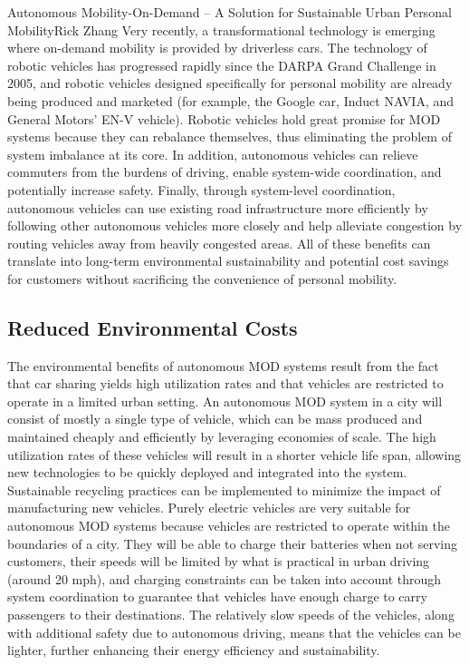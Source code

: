 \documentclass{papertex}
\begin{document}
\begin{news}{2}{Autonomous Mobility-On-Demand – A Solution for Sustainable Urban Personal Mobility}{Rick Zhang}{}{}
Very recently, a transformational technology is emerging where on-demand 
mobility is provided by driverless cars. The technology of robotic vehicles 
has progressed rapidly since the DARPA Grand Challenge in 2005, and robotic 
vehicles designed specifically for personal mobility are already being produced 
and marketed (for example, the Google car, Induct NAVIA, and General Motors’ 
EN-V vehicle). Robotic vehicles hold great promise for MOD systems because 
they can rebalance themselves, thus eliminating the problem of system imbalance 
at its core. In addition, autonomous vehicles can relieve commuters from the 
burdens of driving, enable system-wide coordination, and potentially increase 
safety. Finally, through system-level coordination, autonomous vehicles can 
use existing road infrastructure more efficiently by following other 
autonomous vehicles more closely and help alleviate congestion by routing 
vehicles away from heavily congested areas. All of these benefits can 
translate into long-term environmental sustainability and potential cost 
savings for customers without sacrificing the convenience of personal 
mobility.

\subsection*{\textbf{Reduced Environmental Costs}}

The environmental benefits of autonomous MOD systems result from the fact that 
car sharing yields high utilization rates and that vehicles are restricted to 
operate in a limited urban setting. An autonomous MOD system in a city will 
consist of mostly a single type of vehicle, which can be mass produced and 
maintained cheaply and efficiently by leveraging economies of scale. The high 
utilization rates of these vehicles will result in a shorter vehicle life 
span, allowing new technologies to be quickly deployed and integrated into 
the system. Sustainable recycling practices can be implemented to minimize 
the impact of manufacturing new vehicles. Purely electric vehicles are very 
suitable for autonomous MOD systems because vehicles are restricted to 
operate within the boundaries of a city. They will be able to charge their 
batteries when not serving customers, their speeds will be limited by what is 
practical in urban driving (around 20 mph), and charging constraints can be 
taken into account through system coordination to guarantee that vehicles have 
enough charge to carry passengers to their destinations. The relatively slow 
speeds of the vehicles, along with additional safety due to autonomous driving, 
means that the vehicles can be lighter, further enhancing their energy 
efficiency and sustainability.


\end{news}
\end{document}
